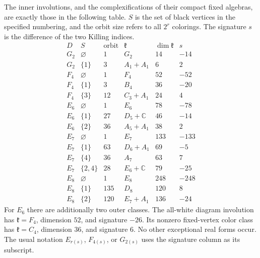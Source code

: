 \begin{theorem}\label{res:J08}
The inner involutions, and the complexifications of their compact
fixed algebras, are exactly those in the following table.
\(S\) is the set of black vertices in the specified numbering,
and the orbit size refers to all \(2^r\) colorings.
The signature \(s\) is the difference of the two Killing indices.
\[
\begin{array}{c|c|r|l|r|r}
 D&S&\text{orbit}&\mathfrak k&\dim\mathfrak k&s\\ \hline
 G_2&\varnothing&1&G_2&14&-14\\
 G_2&\{1\}&3&A_1+A_1&6&2\\ \hline
 F_4&\varnothing&1&F_4&52&-52\\
 F_4&\{1\}&3&B_4&36&-20\\
 F_4&\{3\}&12&C_3+A_1&24&4\\ \hline
 E_6&\varnothing&1&E_6&78&-78\\
 E_6&\{1\}&27&D_5+\mathbb C&46&-14\\
 E_6&\{2\}&36&A_5+A_1&38&2\\ \hline
 E_7&\varnothing&1&E_7&133&-133\\
 E_7&\{1\}&63&D_6+A_1&69&-5\\
 E_7&\{4\}&36&A_7&63&7\\
 E_7&\{2,4\}&28&E_6+\mathbb C&79&-25\\ \hline
 E_8&\varnothing&1&E_8&248&-248\\
 E_8&\{1\}&135&D_8&120&8\\
 E_8&\{2\}&120&E_7+A_1&136&-24
\end{array}
\]
For \(E_6\) there are additionally two outer classes. The all-white
diagram involution has \(\mathfrak k=F_4\), dimension \(52\),
and signature \(-26\). Its nonzero fixed-vertex color class
has \(\mathfrak k=C_4\), dimension \(36\), and signature \(6\).
No other exceptional real forms occur.
The usual notation \(E_{r(s)}\), \(F_{4(s)}\), or \(G_{2(s)}\)
uses the signature column as its subscript.
\end{theorem}
